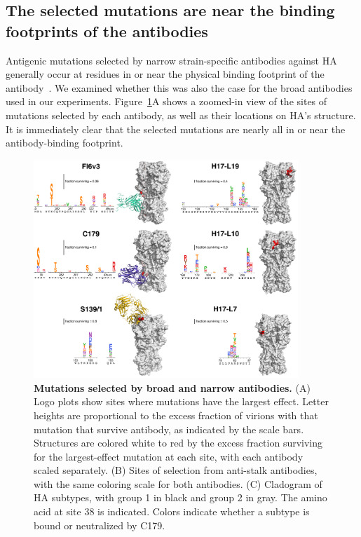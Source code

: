 \documentclass[11pt]{article}
\begin{document}
\subsection*{The selected mutations are near the binding footprints of the antibodies}
Antigenic mutations selected by narrow strain-specific antibodies against HA generally occur at residues in or near the physical binding footprint of the antibody~\citep{yewdell1979antigenic,webster1980determination,caton1982antigenic}.
We examined whether this was also the case for the broad antibodies used in our experiments.
Figure~\ref{fig:structures}A shows a zoomed-in view of the sites of mutations selected by each antibody, as well as their locations on HA's structure. 
It is immediately clear that the selected mutations are nearly all in or near the antibody-binding footprint.

\begin{figure}[h!]
\centerline{\includegraphics[width=0.89\textwidth]{figs/logoplots_pymol/logoplots_pymol.pdf}}
\caption{
\label{fig:structures}
{\bf Mutations selected by broad and narrow antibodies.}
(A) Logo plots show sites where mutations have the largest effect.
Letter heights are proportional to the excess fraction of virions with that mutation that survive antibody, as indicated by the scale bars.
Structures are colored white to red by the excess fraction surviving for the largest-effect mutation at each site, with each antibody scaled separately.  
(B) Sites of selection from anti-stalk antibodies, with the same coloring scale for both antibodies.
(C) Cladogram of HA subtypes, with group 1 in black and group 2 in gray. 
The amino acid at site 38 is indicated. 
Colors indicate whether a subtype is bound or neutralized by C179.  
}
\end{figure}
\end{document}
